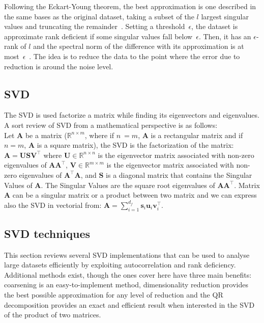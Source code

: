 \documentclass[ijgi,article,submit,moreauthors,pdftex,10pt,a4paper]{Definitions/mdpi}
\def\A{{\mathbf A}}
\def\U{{\mathbf U}}
\def\V{{\mathbf V}}
\def\S{{\mathbf S}}
\def\u{{\mathbf u}}
\def\v{{\mathbf v}}
\def\s{{\mathbf s}}
\begin{document}
Following the Eckart-Young theorem, the best approximation is one described in the same bases as the original dataset, taking a subset of the $l$ largest singular values and truncating the remainder~\cite{Eckart1936}. Setting a threshold~$\epsilon$, the dataset is approximate rank deficient if some singular values fall below~$\epsilon$. Then, it has an $\epsilon$-rank of $l$ and the spectral norm of the difference with its approximation is at most~$\epsilon$~\cite{Martinsson2016}. The idea is to reduce the data to the point where the error due to reduction is around the noise level.

\subsection{SVD}
The SVD is used factorize a matrix while finding its eigenvectors and eigenvalues. A sort review of SVD from a mathematical perspective is as follows: \\
Let $\A$ be a matrix ($\mathbb{R}^{n \times m}$, where if $n~=m$, $\A$ is a rectangular matrix and if $n=m$, $\A$ is a square matrix), the SVD is the factorization of the matrix: $\A=\U\S\V^{\top}$ where $\U \in \mathbb{R}^{n \times n}$ is the eigenvector matrix associated with non-zero eigenvalues of $\A\A^{\top}$, $\V \in \mathbb{R}^{m \times m}$ is the eigenvector matrix associated with non-zero eigenvalues of $\A^{\top}\A$, and $\S$ is a diagonal matrix that contains the Singular Values of $\A$. The Singular Values are the square root eigenvalues of $\A\A^{\top}$. Matrix $\A$ can be a singular matrix or a product between two matrix and we can express also the SVD in vectorial from: $\A=\sum_{i=1}^{d_f} \s_i \u_i \v_i^{\top}$.

\subsection{SVD techniques}
This section reviews several SVD  implementations that can be used to analyse large datasets efficiently by exploiting autocorrelation and rank deficiency. Additional methods exist, though the ones cover here have three main benefits: coarsening is an easy-to-implement method, dimensionality reduction provides the best possible approximation for any level of reduction and the QR decomposition provides an exact and efficient result when interested in the SVD of the product of two matrices.


\end{document}
